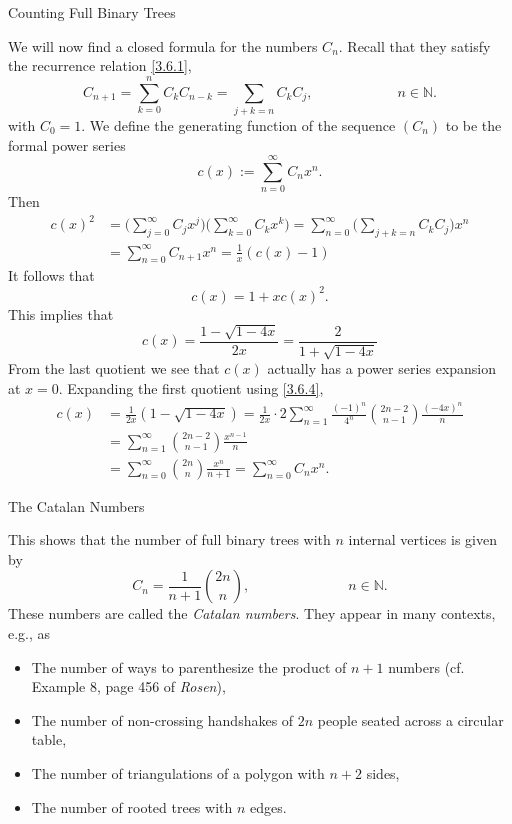 \documentclass[smaller,hyperref={CJKbookmarks=true}]{beamer}
\newcommand{\N}{\mathbb{N}} \newcommand{\Z}{\mathbb{Z}} \newcommand{\Q}{\mathbb{Q}}
\newcounter{zhuo}[subsection]
\begin{document}
\begin{frame}{Counting Full Binary Trees}
\begin{spacing}{0.9}
We will now find a closed formula for the numbers $C_n$. Recall that they
satisfy the recurrence relation \eqref{3.6.1},
\[C_{n+1}=\sum_{k=0}^{n}C_kC_{n-k}=\sum_{j+k=n}C_kC_j,\qquad\qquad\qquad
n\in\N.\]
with $C_0=1$. We define the generating function of the sequence $(C_n)$ to be the formal power series
\[c(x):=\sum_{n=0}^{\infty}C_nx^n.\]
Then
\begin{equation*}
  \begin{split}
     c(x)^2 &=\Big(\sum_{j=0}^{\infty}C_jx^j\Big)\Big(\sum_{k=0}^{\infty}C_kx^k\Big)
     =\sum_{n=0}^{\infty}\Big(\sum_{j+k=n}C_kC_j\Big)x^n \\
       &=\sum_{n=0}^{\infty}C_{n+1}x^n=\frac{1}{x}(c(x)-1)
  \end{split}
\end{equation*}
\newpage
It follows that
\[c(x)=1+xc(x)^2.\]
This implies that
\[c(x)=\frac{1-\sqrt{1-4x}}{2x}=\frac{2}{1+\sqrt{1-4x}}\]
From the last quotient we see that $c(x)$ actually has a power series expansion at $x=0$. Expanding the first quotient using \eqref{3.6.4},
\begin{equation*}
  \begin{split}
     c(x) &=\frac{1}{2x}(1-\sqrt{1-4x})=\frac{1}{2x}\cdot2\sum_{n=1}^{\infty}\frac{(-1)^n}{4^n}
     \binom{2n-2}{n-1}\frac{(-4x)^n}{n} \\
       &=\sum_{n=1}^{\infty}\binom{2n-2}{n-1}\frac{x^{n-1}}{n} \\
       &=\sum_{n=0}^{\infty}\binom{2n}{n}\frac{x^n}{n+1}=\sum_{n=0}^{\infty}C_nx^n.
  \end{split}
\end{equation*}
\end{spacing}
\end{frame}
\begin{frame}[c]{The Catalan Numbers}
\begin{spacing}{1.1}
This shows that the number of full binary trees with $n$ internal vertices is
given by
\[C_n=\frac{1}{n+1}\binom{2n}{n},\qquad\qquad\qquad\quad
n\in\N.\]
These numbers are called the \emph{Catalan numbers}. They appear in many contexts, e.g., as
\begin{itemize}
  \item The number of ways to parenthesize the product of $n + 1$ numbers (cf. Example 8, page 456 of \emph{Rosen}),
  \item The number of non-crossing handshakes of $2n$ people seated across a circular table,
  \item The number of triangulations of a polygon with $n + 2$ sides,
  \item The number of rooted trees with $n$ edges.
\end{itemize}
\end{spacing}
\end{frame}
\end{document}

